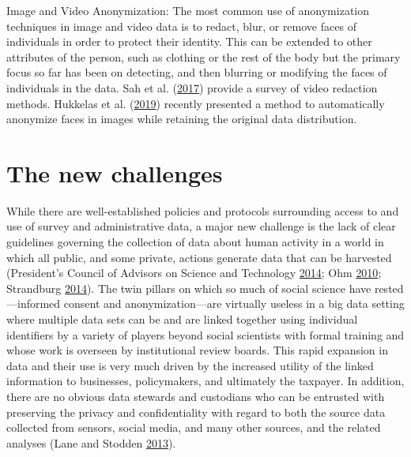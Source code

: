 \documentclass[]{krantz}
\begin{document}
Image and Video Anonymization: The most common use of anonymization
techniques in image and video data is to redact, blur, or remove faces
of individuals in order to protect their identity. This can be extended
to other attributes of the person, such as clothing or the rest of the
body but the primary focus so far has been on detecting, and then
blurring or modifying the faces of individuals in the data. Sah et al.
(\protect\hyperlink{ref-Sah2017}{2017}) provide a survey of video
redaction methods. Hukkelas et al.
(\protect\hyperlink{ref-Hukkelas2019}{2019}) recently presented a method
to automatically anonymize faces in images while retaining the original
data distribution.

\section{The new challenges}\label{the-new-challenges}

While there are well-established policies and protocols surrounding
access to and use of survey and administrative data, a major new
challenge is the lack of clear guidelines governing the collection of
data about human activity in a world in which all public, and some
private, actions generate data that can be harvested (President's
Council of Advisors on Science and Technology
\protect\hyperlink{ref-house2014big}{2014}; Ohm
\protect\hyperlink{ref-ohm2010broken}{2010}; Strandburg
\protect\hyperlink{ref-Strandburg2014}{2014}). The twin pillars on which
so much of social science have rested---informed consent and
anonymization---are virtually useless in a big data setting where
multiple data sets can be and are linked together using individual
identifiers by a variety of players beyond social scientists with formal
training and whose work is overseen by institutional review boards. This
rapid expansion in data and their use is very much driven by the
increased utility of the linked information to businesses, policymakers,
and ultimately the taxpayer. In addition, there are no obvious data
stewards and custodians who can be entrusted with preserving the privacy
and confidentiality with regard to both the source data collected from
sensors, social media, and many other sources, and the related analyses
(Lane and Stodden \protect\hyperlink{ref-lane2013me}{2013}).
\end{document}
